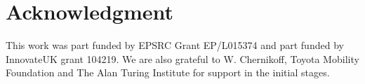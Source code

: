\documentclass[conference]{IEEEtran}
\begin{document}

\section*{Acknowledgment}
This work was part funded by EPSRC Grant EP/L015374 and part funded by InnovateUK grant 104219. 
We are also grateful to W. Chernikoff, Toyota Mobility Foundation and The Alan Turing Institute for support in the initial stages.







\end{document}
